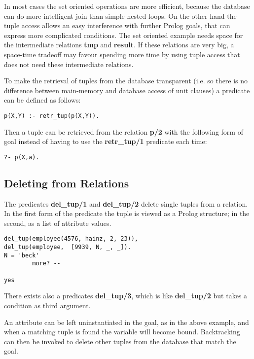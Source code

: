 In most cases the set oriented operations are more efficient, because
the database can do more intelligent join than simple nested loops.
On the other hand the tuple access allows an easy interference with
further Prolog goals, that can express more complicated conditions.
The set oriented example needs space for the intermediate relations
{\bf tmp} and {\bf result}. If these relations are very big, a
space-time tradeoff may favour spending more time by using tuple
access that does not need these intermediate relations.

To make the retrieval of tuples from the database transparent (i.e. so there
is no difference between main-memory and database access of unit clauses) 
a predicate can be defined as follows:
\begin{verbatim}
p(X,Y) :- retr_tup(p(X,Y)).
\end{verbatim}

Then a tuple can be retrieved from the relation {\bf p/2} with the 
following form of goal instead of having to use the {\bf retr\_tup/1}
predicate each time:

\begin{verbatim}
?- p(X,a).
\end{verbatim}

    
\subsection{Deleting from Relations}
The predicates {\bf del\_tup/1} and {\bf del\_tup/2} delete single
tuples from a relation. In the first form of the predicate the
tuple is viewed as a Prolog structure; in the second, as a list
of attribute values.  
\begin{verbatim}
del_tup(employee(4576, hainz, 2, 23)),
del_tup(employee,  [9939, N, _, _]).        
N = 'beck'
        more? -- 

yes
\end{verbatim}
There exists also a predicates {\bf del\_tup/3}, which is like 
{\bf del\_tup/2} but takes a condition as third argument.

An attribute can be left uninstantiated in the goal, as in the above example,
and when a matching tuple is found the variable will become bound.
Backtracking can then be invoked to delete other tuples from the database
that match the goal.
